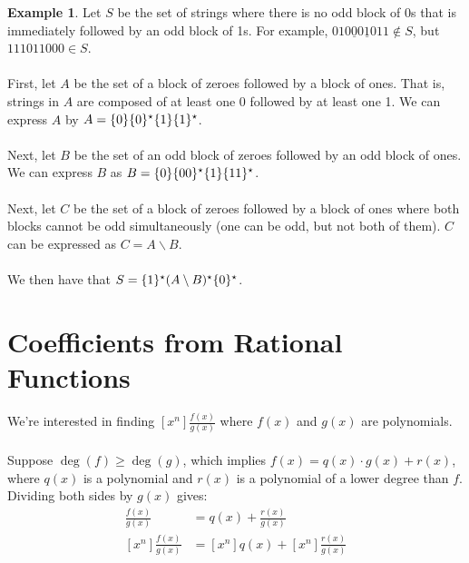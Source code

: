 \documentclass[]{article}
\theoremstyle{definition}
\newtheorem{ex}{Example}[section]
\newcommand{\lecture}[1]{\marginpar{{\footnotesize $\leftarrow$ \underline{#1}}}}
\DeclarePairedDelimiter{\set}{\lbrace}{\rbrace}
\begin{document}
				\begin{ex}
					Let $S$ be the set of strings where there is no odd block of 0s that is immediately followed by an odd block of 1s. For example, $01\underline{000}\underline{1}011 \not \in S$, but $111011000 \in S$.
					\\ \\
					First, let $A$ be the set of a block of zeroes followed by a block of ones. That is, strings in $A$ are composed of at least one 0 followed by at least one 1. We can express $A$ by $A = \set{0}\set{0}^\star\set{1}\set{1}^\star$.
					\\ \\
					Next, let $B$ be the set of an odd block of zeroes followed by an odd block of ones. We can express $B$ as $B = \set{0}\set{00}^\star\set{1}\set{11}^\star$.
					\\ \\
					Next, let $C$ be the set of a block of zeroes followed by a block of ones where both blocks cannot be odd simultaneously (one can be odd, but not both of them). $C$ can be expressed as $C = A \mathbin{\backslash} B$.
					\\ \\
					We then have that $S = \set{1}^\star(A \mathbin{\backslash} B)^\star \set{0}^\star$.

				\end{ex}
	
	\section{Coefficients from Rational Functions} \lecture{February 6, 2013}
		We're interested in finding $[x^n]\frac{f(x)}{g(x)}$ where $f(x)$ and $g(x)$ are polynomials.
		\\ \\
		Suppose $\deg(f) \ge \deg(g)$, which implies $f(x) = q(x) \cdot g(x) + r(x)$, where $q(x)$ is a polynomial and $r(x)$ is a polynomial of a lower degree than $f$. Dividing both sides by $g(x)$ gives:
		\begin{align*}
			\frac{f(x)}{g(x)} &= q(x) + \frac{r(x)}{g(x)} \\
			[x^n] \frac{f(x)}{g(x)} &= [x^n] q(x) + [x^n] \frac{r(x)}{g(x)}
		\end{align*}
\end{document}
